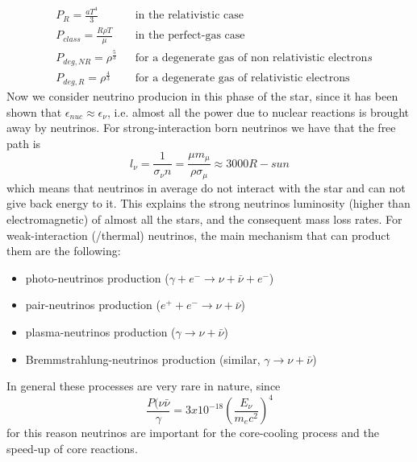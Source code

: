 \documentclass[main.tex]{subfiles}
\begin{document}
\begin{subequations}
\begin{align}
&P_R=\frac{aT^4}{3} && \text{in the relativistic case}\\
&P_{class}=\frac{R\rho T}{\mu} && \text{in the perfect-gas case}\\
&P_{deg,NR}=\rho^{\frac{5}{3}} && \text{for a degenerate gas of non relativistic electron}s\\
&P_{deg,R}=\rho^{\frac{4}{3}} && \text{for a degenerate gas of relativistic electrons}
\end{align}
\end{subequations}
Now we consider neutrino producion in this phase of the star, since it has been shown that $\epsilon_{nuc}\approx\epsilon_\nu$, i.e. almost all the power due to nuclear reactions is brought away by neutrinos. For strong-interaction born neutrinos we have that the free path is
\begin{equation}
    l_\nu=\frac{1}{\sigma_\nu n}=\frac{\mu m_\mu}{\rho\sigma_\mu}\approx 3000 R-sun
\end{equation}
which means that neutrinos in average do not interact with the star and can not give back energy to it. This explains the strong neutrinos luminosity (higher than electromagnetic) of almost all the stars, and the consequent mass loss rates.
For weak-interaction (/thermal) neutrinos, the main mechanism that can product them are the following:
\begin{itemize}
    \item photo-neutrinos production ($\gamma+e^- \to \nu + \bar\nu +e^-$)
    \item pair-neutrinos production ($e^++e^- \to \nu + \bar\nu $)
    \item plasma-neutrinos production ($\gamma \to \nu + \bar\nu $)
    \item Bremmstrahlung-neutrinos production (similar, $\gamma \to \nu + \bar\nu $)
\end{itemize}
In general these processes are very rare in nature, since
\begin{equation}
    \frac{P(\nu\bar\nu}{\gamma}=3x10^{-18}\left(\frac{E_\nu}{m_e c^2}\right)^4
\end{equation}
for this reason neutrinos are important for the core-cooling process and the speed-up of core reactions.
\end{document}
